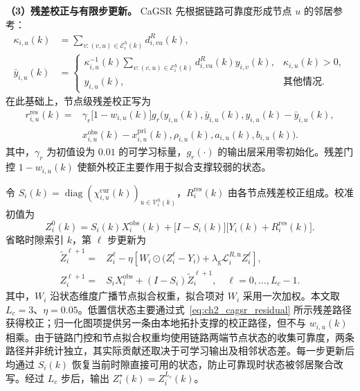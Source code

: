 \textbf{（3）残差校正与有限步更新。} CaGSR 先根据链路可靠度形成节点 $u$ 的邻居参考：
\begin{equation}
\begin{aligned}
\kappa_{i,u}(k)&=\sum_{v:(v,u)\in\mathcal E_i^h(k)}d_{i,vu}^{R}(k),\\
\bar y_{i,u}(k)&=
\begin{cases}
\displaystyle \kappa_{i,u}^{-1}(k)
\sum_{v:(v,u)\in\mathcal E_i^h(k)}d_{i,vu}^{R}(k)y_{i,v}(k),
&\kappa_{i,u}(k)>0,\\[2mm]
y_{i,u}(k),&\text{其他情况}.
\end{cases}
\end{aligned}
\label{eq:ch2_cagsr_neighborref}
\end{equation}
在此基础上，节点级残差校正写为
\begin{equation}
\begin{aligned}
r_{i,u}^{\mathrm{res}}(k)
={}&\gamma_r\big[1-w_{i,u}(k)\big]g_r\!\Big(
y_{i,u}(k),\bar y_{i,u}(k),y_{i,u}(k)-\bar y_{i,u}(k),\\
&x_{i,u}^{\mathrm{obs}}(k)-x_{i,u}^{\mathrm{pri}}(k),
\rho_{i,u}(k),a_{i,u}(k),b_{i,u}(k)\Big).
\end{aligned}
\label{eq:ch2_cagsr_residual}
\end{equation}
其中，$\gamma_r$ 为初值设为 $0.01$ 的可学习标量，$g_r(\cdot)$ 的输出层采用零初始化。残差门控 $1-w_{i,u}(k)$ 使额外校正主要作用于拟合支撑较弱的状态。

令 $S_i(k)=\operatorname{diag}(\chi_{i,u}^{\mathrm{cur}}(k))_{u\in\mathcal V_i^h(k)}$，$R_i^{\mathrm{res}}(k)$ 由各节点残差校正组成。校准初值为
\begin{equation}
Z_i^0(k)=S_i(k)X_i^{\mathrm{obs}}(k)
+\big[I-S_i(k)\big]\big[Y_i(k)+R_i^{\mathrm{res}}(k)\big].
\label{eq:ch2_cagsr_initialization}
\end{equation}
省略时隙索引 $k$，第 $\ell$ 步更新为
\begin{equation}
\begin{aligned}
\widetilde Z_i^{\ell+1}
={}&Z_i^\ell-\eta\left[
W_i\odot\big(Z_i^\ell-Y_i\big)
+\lambda_{\mathrm g}\mathcal L_i^{R,\mathrm n}Z_i^\ell\right],\\
Z_i^{\ell+1}
={}&S_iX_i^{\mathrm{obs}}+(I-S_i)\widetilde Z_i^{\ell+1},
\quad \ell=0,\ldots,L_c-1.
\end{aligned}
\label{eq:ch2_cagsr_update}
\end{equation}
其中，$W_i$ 沿状态维度广播节点拟合权重，拟合项对 $W_i$ 采用一次加权。本文取 $L_c=3$、$\eta=0.05$。低置信状态主要通过式~\eqref{eq:ch2_cagsr_residual} 所示残差路径获得校正；归一化图项提供另一条由本地拓扑支撑的校正路径，但不与 $w_{i,u}(k)$ 相乘。由于链路门控和节点拟合权重均使用链路两端节点状态的收集可靠度，两条路径并非统计独立，其实际贡献还取决于可学习输出及相邻状态差。每一步更新后均通过 $S_i(k)$ 恢复当前时隙直接可用的状态，防止可靠现时状态被邻居聚合改写。经过 $L_c$ 步后，输出 $Z_i^\star(k)=Z_i^{L_c}(k)$。

